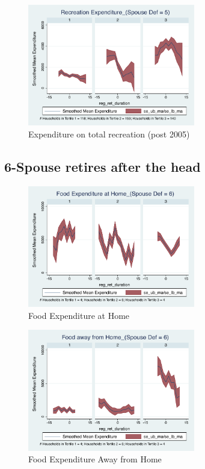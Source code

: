 \documentclass[11pt,onecolumn]{article}
\numberwithin{figure}{section}
\begin{document}
\begin{figure}[h]
	\caption{Expenditure on total recreation (post 2005)}
	\centering
	\includegraphics[width=0.65\textwidth]{../ConsumptionPostRetirement_by_SpouseDef_Cats/Smoothed/5/spouse_def_total_recreation_2005_real.pdf}
\end{figure}

\clearpage

\subsection{6-Spouse retires after the head}

\begin{figure}[h]
	\caption{Food Expenditure at Home}
	\centering
	\includegraphics[width=0.65\textwidth]{../ConsumptionPostRetirement_by_SpouseDef_Cats/Smoothed/6/spouse_def_total_foodexp_home_real.pdf}
\end{figure}


\begin{figure}[h]
	\caption{Food Expenditure Away from Home}
	\centering
	\includegraphics[width=0.65\textwidth]{../ConsumptionPostRetirement_by_SpouseDef_Cats/Smoothed/6/spouse_def_total_foodexp_away_real.pdf}
\end{figure}
\end{document}
